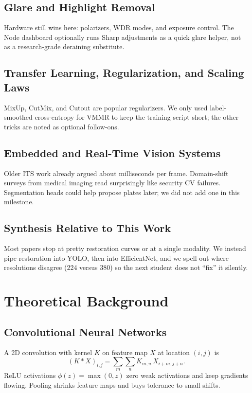 \documentclass[10pt, conference]{IEEEtran}
\begin{document}
\subsection{Glare and Highlight Removal}
Hardware still wins here: polarizers, WDR modes, and exposure control. The Node dashboard optionally runs Sharp adjustments as a quick glare helper, not as a research-grade deraining substitute.

\subsection{Transfer Learning, Regularization, and Scaling Laws}
MixUp, CutMix, and Cutout are popular regularizers. We only used label-smoothed cross-entropy for VMMR to keep the training script short; the other tricks are noted as optional follow-ons.

\subsection{Embedded and Real-Time Vision Systems}
Older ITS work already argued about milliseconds per frame. Domain-shift surveys from medical imaging read surprisingly like security CV failures. Segmentation heads could help propose plates later; we did not add one in this milestone.

\subsection{Synthesis Relative to This Work}
Most papers stop at pretty restoration curves or at a single modality. We instead pipe restoration into YOLO, then into EfficientNet, and we spell out where resolutions disagree (224 versus 380) so the next student does not ``fix'' it silently.

\section{Theoretical Background}
\label{sec:theory}
\subsection{Convolutional Neural Networks}
A 2D convolution with kernel $K$ on feature map $X$ at location $(i,j)$ is
\begin{equation}
(K * X)_{i,j}=\sum_m\sum_n K_{m,n}\,X_{i+m,j+n}.
\label{eq:conv}
\end{equation}
ReLU activations $\phi(z)=\max(0,z)$ zero weak activations and keep gradients flowing. Pooling shrinks feature maps and buys tolerance to small shifts.
\end{document}
